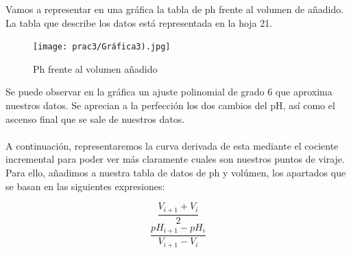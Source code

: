 \noindent Vamos a representar en una gráfica la tabla de ph frente al volumen de  añadido. La tabla que describe los datos está representada en la hoja 21.

\begin{figure}[H]
    \centering
    \hspace*{-2.3cm}
        \texttt{[image: prac3/Gráfica3).jpg]}
    \hspace*{-2.3cm}
    \caption{Ph frente al volumen añadido}
\end{figure}

\noindent Se puede observar en la gráfica un ajuste polinomial de grado 6 que aproxima nuestros datos. Se aprecian a la perfección los dos cambios del pH, así como el ascenso final que se sale de nuestros datos.\\\\
\noindent A continuación, representaremos la curva derivada de esta mediante el cociente incremental para poder ver más claramente cuales son nuestros puntos de viraje. Para ello, añadimos a nuestra tabla de datos de ph y volúmen, los apartados que se basan en las siguientes expresiones:

\[\frac{V_{i+1}+V_i}{2}\]
\[\frac{pH_{i+1}-pH_i}{V_{i+1}-V_i}\]
\clearpage

